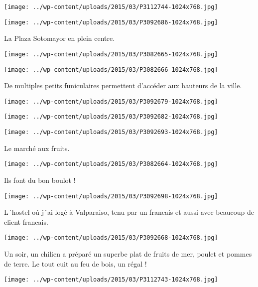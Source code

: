  \newline
\centerline{\texttt{[image: ../wp-content/uploads/2015/03/P3112744-1024x768.jpg]} } 
 \newline
\centerline{\texttt{[image: ../wp-content/uploads/2015/03/P3092686-1024x768.jpg]} } 
 \newline
 La Plaza Sotomayor en plein centre. \newline
 \newline
\centerline{\texttt{[image: ../wp-content/uploads/2015/03/P3082665-1024x768.jpg]} } 
 \newline
\centerline{\texttt{[image: ../wp-content/uploads/2015/03/P3082666-1024x768.jpg]} } 
 \newline
 De multiples petits funiculaires permettent d'accéder aux hauteurs de la ville. \newline
 \newline
\centerline{\texttt{[image: ../wp-content/uploads/2015/03/P3092679-1024x768.jpg]} } 
 \newline
\centerline{\texttt{[image: ../wp-content/uploads/2015/03/P3092682-1024x768.jpg]} } 
 \newline
\centerline{\texttt{[image: ../wp-content/uploads/2015/03/P3092693-1024x768.jpg]} } 
Le marché aux fruits. \newline
 \newline
\centerline{\texttt{[image: ../wp-content/uploads/2015/03/P3082664-1024x768.jpg]} } 
Ils font du bon boulot !\newline
\centerline{\texttt{[image: ../wp-content/uploads/2015/03/P3092698-1024x768.jpg]} } 
 \newline
 L´hostel oú j´ai logé à Valparaiso, tenu par un francais et aussi avec beaucoup de client francais. \newline
 \newline
\centerline{\texttt{[image: ../wp-content/uploads/2015/03/P3092668-1024x768.jpg]} } 
 \newline
 Un soir, un chilien a préparé un superbe plat de fruits de mer, poulet et pommes de terre. Le tout cuit au feu de bois, un régal ! \newline
 \newline
\centerline{\texttt{[image: ../wp-content/uploads/2015/03/P3112743-1024x768.jpg]} } 
 \newline
 \newline
